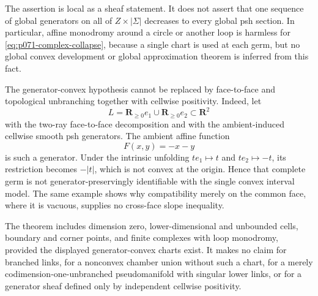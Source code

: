 The assertion is local as a sheaf statement.  It does not assert that one
sequence of global generators on all of \(Z\times|\Sigma|\) decreases to
every global psh section.  In particular, affine monodromy around a circle
or another loop is harmless for \eqref{eq:p071-complex-collapse}, because a
single chart is used at each germ, but no global convex development or
global approximation theorem is inferred from this fact.

The generator-convex hypothesis cannot be replaced by face-to-face and
topological unbranching together with cellwise positivity.  Indeed, let
\[
 L=\mathbf R_{\geq0}e_1\cup\mathbf R_{\geq0}e_2\subset\mathbf R^2
\]
with the two-ray face-to-face decomposition and with the ambient-induced
cellwise smooth psh generators.  The ambient affine function
\begin{equation}
                         F(x,y)=-x-y
 \label{eq:p071-complex-v-function}
\end{equation}
is such a generator.  Under the intrinsic unfolding
\(te_1\mapsto t\) and \(te_2\mapsto -t\), its restriction becomes
\(-|t|\), which is not convex at the origin.  Hence that complete germ is
not generator-preservingly identifiable with the single convex interval
model.  The same example shows why compatibility merely on the common
face, where it is vacuous, supplies no cross-face slope inequality.

The theorem includes dimension zero, lower-dimensional and unbounded
cells, boundary and corner points, and finite complexes with loop
monodromy, provided the displayed generator-convex charts exist.  It makes
no claim for branched links, for a nonconvex chamber union without such a
chart, for a merely codimension-one-unbranched pseudomanifold with singular
lower links, or for a generator sheaf defined only by independent
cellwise positivity.

